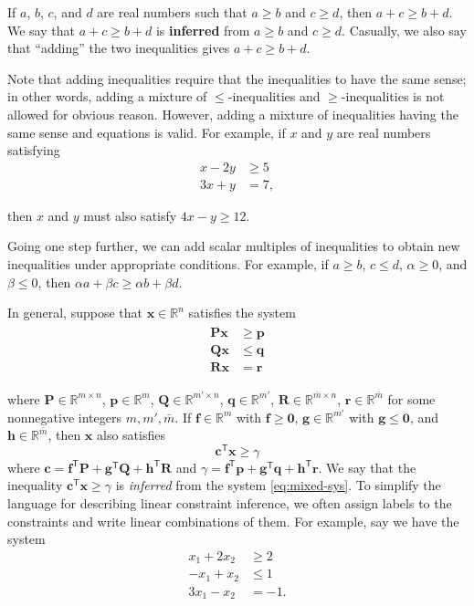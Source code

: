 \documentclass[]{book}
\newcommand{\RR}{\mathbb{R}}
\newcommand{\T}{\mathsf{T}}
\newcommand{\mm}[1]{\mathbf{#1}}
\renewcommand{\vec}[1]{\mathbf{#1}}
\theoremstyle{definition}
\theoremstyle{definition}
\theoremstyle{remark}
\begin{document}
If \(a\), \(b\), \(c\), and \(d\) are real numbers such that
\(a \geq b\) and \(c \geq d\), then \(a + c \geq b + d\). We say that
\(a + c \geq b + d\) is \textbf{inferred} from \(a \geq b\) and
\(c \geq d\). Casually, we also say that ``adding'' the two inequalities
gives \(a + c \geq b + d\).

Note that adding inequalities require that the inequalities to have the
same sense; in other words, adding a mixture of \(\leq\)-inequalities
and \(\geq\)-inequalities is not allowed for obvious reason. However,
adding a mixture of inequalities having the same sense and equations is
valid. For example, if \(x\) and \(y\) are real numbers satisfying
\begin{align*}
x - 2y & \geq 5 \\
3x + y & = 7,
\end{align*}

then \(x\) and \(y\) must also satisfy \(4x - y \geq 12\).

Going one step further, we can add scalar multiples of inequalities to
obtain new inequalities under appropriate conditions. For example, if
\(a\geq b\), \(c \leq d\), \(\alpha \geq 0\), and \(\beta \leq 0\), then
\(\alpha a + \beta c \geq \alpha b + \beta d\).

In general, suppose that \(\vec{x} \in \RR^n\) satisfies the system
\begin{align}
\begin{split}
\mm{P} \vec{x} & \geq \vec{p} \\
\mm{Q} \vec{x} & \leq \vec{q} \\
\mm{R} \vec{x} & = \vec{r} 
\end{split}
\label{eq:mixed-sys}
\end{align}

where \(\mm{P} \in \RR^{m \times n}\), \(\vec{p} \in \RR^m\),
\(\mm{Q} \in \RR^{m' \times n}\), \(\vec{q} \in \RR^{m'}\),
\(\mm{R} \in \RR^{\bar{m} \times n}\), \(\vec{r} \in \RR^{\bar{m}}\) for
some nonnegative integers \(m, m', \bar{m}\). If \(\vec{f} \in \RR^m\)
with \(\vec{f} \geq \vec{0}\), \(\vec{g} \in \RR^{m'}\) with
\(\vec{g} \leq \vec{0}\), and \(\vec{h} \in \RR^{\bar{m}}\), then
\(\vec{x}\) also satisfies \[ \vec{c}^\T \vec{x} \geq \gamma\] where
\(\vec{c} =  \vec{f}^\T\mm{P}+ \vec{g}^\T \mm{Q} +\vec{h}^\T \mm{R}\)
and
\(\gamma =  \vec{f}^\T\vec{p}+ \vec{g}^\T \vec{q} +\vec{h}^\T \vec{r}\).
We say that the inequality \(\vec{c}^\T \vec{x} \geq \gamma\) is
\emph{inferred} from the system \eqref{eq:mixed-sys}. To simplify the
language for describing linear constraint inference, we often assign
labels to the constraints and write linear combinations of them. For
example, say we have the system
\begin{align}
x_1 + 2x_2 & \geq 2  \label{eq:lin-comb-geq} \\
-x_1 + x_2 & \leq 1  \label{eq:lin-comb-leq} \\
3x_1 - x_2 & = -1.  \label{eq:lin-comb-eq}
\end{align}
\end{document}

